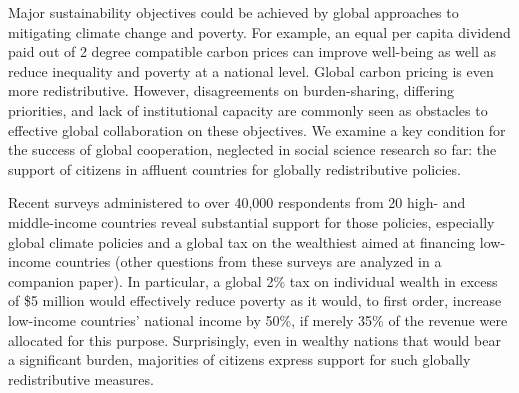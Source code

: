 \documentclass{nature}
\begin{document}
Major sustainability objectives could be achieved by global approaches to mitigating climate change and poverty.\cite{budolfson_climate_2021,franks_mobilizing_2018,dennig_inequality_2015,soergel_combining_2021} For example, an equal per capita dividend paid out of 2 degree compatible carbon prices can improve well-being as well as reduce inequality and poverty at a national level.\cite{budolfson_climate_2021} Global carbon pricing is even more redistributive.\cite{bauer_quantification_2020} 
However, disagreements on burden-sharing, differing priorities, and lack of institutional capacity are commonly seen as obstacles to effective global collaboration on these objectives.\cite{cramton_global_2017} We examine a key condition for the success of global cooperation, neglected in social science research so far: the support of citizens in affluent countries for globally redistributive policies.%

Recent surveys administered to over 40,000 respondents from 20 high- and middle-income countries reveal substantial support for those policies, especially global climate policies and a global tax on the wealthiest aimed at financing low-income countries (other questions from these surveys are analyzed in a companion paper\cite{dechezlepretre_fighting_2022}). 
In particular, a global 2\% tax on individual wealth in excess of \$5 million would effectively reduce poverty as it would, to first order, increase low-income countries' national income by 50\%, if merely 35\% of the revenue were allocated for this purpose.\cite{chancel_world_2022} %
Surprisingly, even in wealthy nations that would bear a significant burden, majorities of citizens express support for such globally redistributive measures.%
\end{document}
